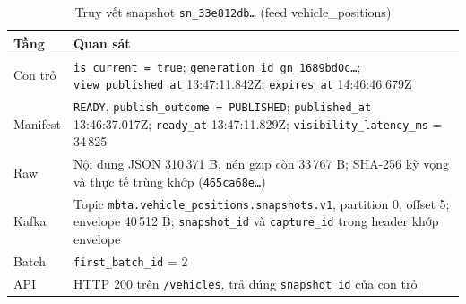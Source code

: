 \begin{table}[H]
\centering
\tablefont
\caption{Truy vết snapshot \texttt{sn\_33e812db\ldots} (feed vehicle\_positions)}
\label{tab:lineage}
\begin{tabular}{p{2.20cm}p{13.40cm}}
\toprule
\textbf{Tầng} & \textbf{Quan sát} \\
\midrule
Con trỏ & \texttt{is\_current = true}; \texttt{generation\_id gn\_1689bd0c\ldots}; \texttt{view\_published\_at} 13:47:11.842Z; \texttt{expires\_at} 14:46:46.679Z \\
Manifest & \texttt{READY}, \texttt{publish\_outcome = PUBLISHED}; \texttt{published\_at} 13:46:37.017Z; \texttt{ready\_at} 13:47:11.829Z; \texttt{visibility\_latency\_ms} = 34\,825 \\
Raw & Nội dung JSON 310\,371 B, nén gzip còn 33\,767 B; SHA-256 kỳ vọng và thực tế trùng khớp (\texttt{465ca68e\ldots}) \\
Kafka & Topic \texttt{mbta.vehicle\_positions.snapshots.v1}, partition 0, offset 5; envelope 40\,512 B; \texttt{snapshot\_id} và \texttt{capture\_id} trong header khớp envelope \\
Batch & \texttt{first\_batch\_id} = 2 \\
API & HTTP 200 trên \texttt{/vehicles}, trả đúng \texttt{snapshot\_id} của con trỏ \\
\bottomrule
\end{tabular}
\end{table}

